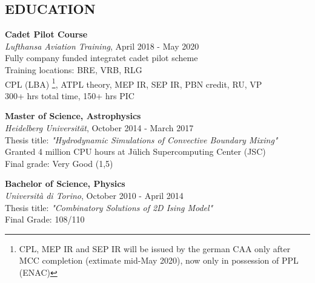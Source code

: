 \documentclass[margin]{res}
\begin{document}
\begin{resume}


\section{EDUCATION}

\textbf{Cadet Pilot Course}\\
{\sl Lufthansa Aviation Training}, April 2018 - May 2020\\
Fully company funded integratet cadet pilot scheme\\
Training locations: BRE, VRB, RLG\\
CPL (LBA) \footnote[1]{CPL, MEP IR and SEP IR will be issued by the german CAA only after MCC completion (extimate mid-May 2020), now only in possession of PPL (ENAC)}, ATPL theory, MEP IR, SEP IR, PBN credit, RU, VP\\
300+ hrs total time, 150+ hrs PIC

\textbf{Master of Science, Astrophysics}\\
{\sl Heidelberg Universität}, October 2014 - March 2017\\
Thesis title: \textit{"Hydrodynamic Simulations of Convective Boundary Mixing"}\\
Granted 4 million CPU hours at Jülich Supercomputing Center (JSC)\\
\hfill Final grade: Very Good (1,5)

\textbf{Bachelor of Science, Physics} \\
{\sl Università di Torino}, October 2010 - April 2014\\
Thesis title: \textit{"Combinatory Solutions of 2D Ising Model"}\\
\hfill Final Grade: 108/110


\end{resume}
\end{document}

